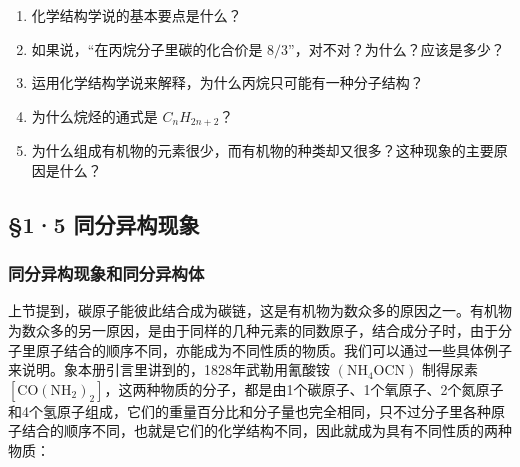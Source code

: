 \begin{enumerate}
\item
  化学结构学说的基本要点是什么？
\item
  如果说，``在丙烷分子里碳的化合价是
  \(8/3\)''，对不对？为什么？应该是多少？
\item
  运用化学结构学说来解释，为什么丙烷只可能有一种分子结构？
\item
  为什么烷烃的通式是 \(C_{n}H_{2n+2}\)？
\item
  为什么组成有机物的元素很少，而有机物的种类却又很多？这种现象的主要原因是什么？
\end{enumerate}

\subsection{§1·5 同分异构现象}

\subsubsection{同分异构现象和同分异构体}

上节提到，碳原子能彼此结合成为碳链，这是有机物为数众多的原因之一。有机物为数众多的另一原因，是由于同样的几种元素的同数原子，结合成分子时，由于分子里原子结合的顺序不同，亦能成为不同性质的物质。我们可以通过一些具体例子来说明。象本册引言里讲到的，1828年武勒用氰酸铵
\(\left(\mathrm{NH}_{4}\mathrm{OCN}\right)\) 制得尿素
\(\left[\mathrm{CO}\left(\mathrm{NH}_{2}\right)_{2}\right]\)，这两种物质的分子，都是由1个碳原子、1个氧原子、2个氮原子和4个氢原子组成，它们的重量百分比和分子量也完全相同，只不过分子里各种原子结合的顺序不同，也就是它们的化学结构不同，因此就成为具有不同性质的两种物质：

